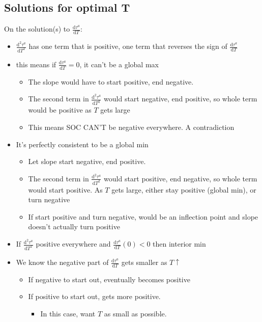\documentclass[12pt]{article}
\begin{document}
\vskip1in
\subsection{Solutions for optimal T}
On the solution(s) to $\frac{\mathrm{d} \tau^a}{\mathrm{d} T}$:
\begin{itemize}
	\item $\frac{\mathrm{d}^2 \tau^a}{\mathrm{d} T^2}$ has one term that is positive, one term that reverses the sign of $\frac{\mathrm{d} \tau^a}{\mathrm{d} T}$
	\item this means if $\frac{\mathrm{d} \tau^a}{\mathrm{d} T} =0$, it can't be a global max
		\begin{itemize}
			\item The slope would have to start positive, end negative.
			\item The second term in $\frac{\mathrm{d}^2 \tau^a}{\mathrm{d} T^2}$ would start negative, end positive, so whole term would be positive as $T$ gets large
			\item This means SOC CAN'T be negative everywhere. A contradiction
		\end{itemize}
	\item It's perfectly consistent to be a global min
		\begin{itemize}
			\item Let slope start negative, end positive.
			\item The second term in $\frac{\mathrm{d}^2 \tau^a}{\mathrm{d} T^2}$ would start positive, end negative, so whole term would start positive. As $T$ gets large, either stay positive (global min), or turn negative
			\item If start positive and turn negative, would be an inflection point and slope doesn't actually turn positive
		\end{itemize}
	\item If $\frac{\mathrm{d}^2 \tau^a}{\mathrm{d} T^2}$ positive everywhere and $\frac{\mathrm{d} \tau^a}{\mathrm{d} T}\left(0\right) < 0$ then interior min
	\item We know the negative part of $\frac{\mathrm{d} \tau^a}{\mathrm{d} T}$ gets smaller as $T \uparrow$
		\begin{itemize}
			\item If negative to start out, eventually becomes positive
			\item If positive to start out, gets more positive. 
				\begin{itemize}
					\item In this case, want $T$ as small as possible.
				\end{itemize}
		\end{itemize}
\end{itemize}
\end{document}
